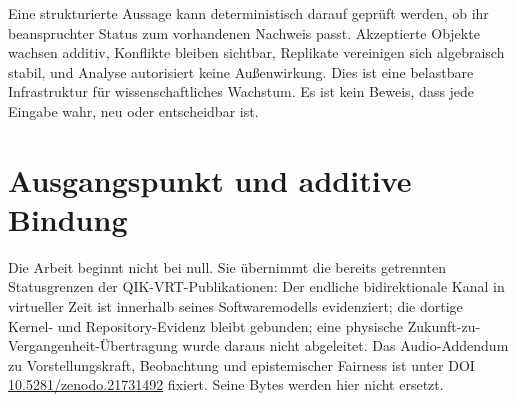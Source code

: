 \documentclass[11pt,a4paper,oneside]{article}
\begin{document}
\begin{abstract}
Diese Arbeit operationalisiert einen wissenschaftlichen Erkenntnisbaum für
QIK-VRT-Repositories. Ihr Kern ist kein universeller Wahrheitsautomat, sondern
eine endliche, fail-closed und reproduzierbare Pipeline. Sie trennt formale
Ableitung, empirische Evidenz, Quellenbindung, Norm, Interpretation und offene
Frage; bindet jedes Objekt an kanonische Bytes und Provenienz; erhält Konflikte;
und vereinigt Replikate deterministisch. Lean~4.19.0 prüft 21 Sätze über
Typisierung, append-only Wachstum, Merge-Algebra, bedingte Konvergenz,
Evidenzschluss, Kausalitäts- und Beobachtungsgates, Digital-Twin-Aktorgrenzen
und proposal-only Nichtwirkung. Ein ausführbarer Python-Kern implementiert die
gebundene Klassifikation. Die Architektur ist auf Softwaretraces, klassische
Mess- und Regeltechnik, digitale Zwillinge und Quantenexperiment-Metadaten
anwendbar, sofern domänenspezifische Kalibrierungs-, Unsicherheits- und
Identifikationsnachweise hinzukommen. Globale wissenschaftliche Neuheit,
vollständige Sprachformalisierung, universelle Antworten und eine physische
Quanten- oder Retrokausalitätsbrücke bleiben ausdrücklich offen.
\end{abstract}

\begin{resultbox}
Eine strukturierte Aussage kann deterministisch darauf geprüft werden, ob ihr
beanspruchter Status zum vorhandenen Nachweis passt. Akzeptierte Objekte wachsen
additiv, Konflikte bleiben sichtbar, Replikate vereinigen sich algebraisch
stabil, und Analyse autorisiert keine Außenwirkung. Dies ist eine belastbare
Infrastruktur für wissenschaftliches Wachstum. Es ist kein Beweis, dass jede
Eingabe wahr, neu oder entscheidbar ist.
\end{resultbox}

\begingroup
\small
\setcounter{tocdepth}{1}
\tableofcontents
\endgroup
\newpage

\section{Ausgangspunkt und additive Bindung}

Die Arbeit beginnt nicht bei null. Sie übernimmt die bereits getrennten
Statusgrenzen der QIK-VRT-Publikationen: Der endliche bidirektionale Kanal in
virtueller Zeit ist innerhalb seines Softwaremodells evidenziert; die dortige
Kernel- und Repository-Evidenz bleibt gebunden; eine physische
Zukunft-zu-Vergangenheit-Übertragung wurde daraus nicht abgeleitet. Das
Audio-Addendum zu Vorstellungskraft, Beobachtung und epistemischer Fairness ist
unter DOI \href{https://doi.org/10.5281/zenodo.21731492}{10.5281/zenodo.21731492}
fixiert. Seine Bytes werden hier nicht ersetzt.
\end{document}
